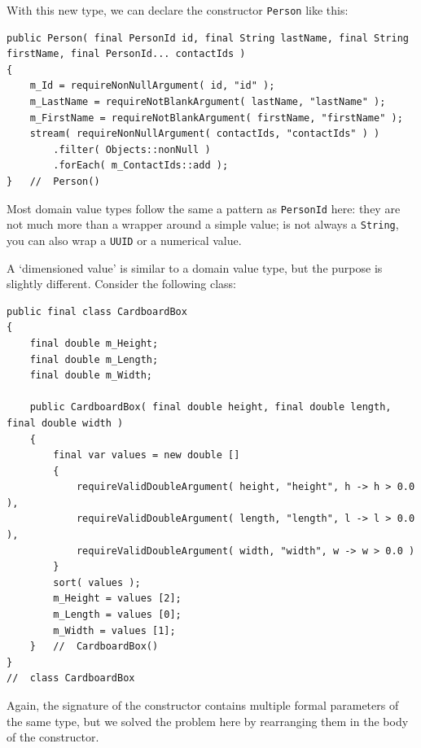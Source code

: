 \documentclass[11pt,a4paper, titlepage, parskip=half, headsepline, footsepline, cleardoublepage=current, headheight=1cm]{scrbook}
\begin{document}
With this new type, we can declare the constructor \lstinline|Person| like this:
\begin{lstlisting}
public Person( final PersonId id, final String lastName, final String firstName, final PersonId... contactIds )
{
    m_Id = requireNonNullArgument( id, "id" );
    m_LastName = requireNotBlankArgument( lastName, "lastName" );
    m_FirstName = requireNotBlankArgument( firstName, "firstName" );
    stream( requireNonNullArgument( contactIds, "contactIds" ) )
        .filter( Objects::nonNull )
        .forEach( m_ContactIds::add );
}   //  Person()
\end{lstlisting}

Most domain value types follow the same a pattern as \lstinline|PersonId| here: they are  not much more than a wrapper around a simple value; is not always a \lstinline|String|, you can also wrap a \lstinline|UUID|\autocite{ORACLE_DOC_UUID_CLASS} or a numerical value.

A ‘dimensioned value’ is similar to a domain value type, but the purpose is slightly different. Consider the following class:
\begin{lstlisting}
public final class CardboardBox
{
    final double m_Height;
    final double m_Length;
    final double m_Width;
    
    public CardboardBox( final double height, final double length, final double width )
    {
        final var values = new double [] 
        { 
            requireValidDoubleArgument( height, "height", h -> h > 0.0 ),
            requireValidDoubleArgument( length, "length", l -> l > 0.0 ),
            requireValidDoubleArgument( width, "width", w -> w > 0.0 )
        }
        sort( values );
        m_Height = values [2];
        m_Length = values [0];
        m_Width = values [1];
    }   //  CardboardBox()
}
//  class CardboardBox
\end{lstlisting}

Again, the signature of the constructor contains multiple formal parameters of the same type, but we solved the problem here by rearranging them in the body of the constructor.
\end{document}
